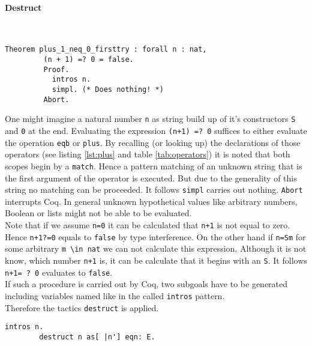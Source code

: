 	   \paragraph{Destruct}	~\vspace{-5mm}
	   \begin{lstlisting}[caption= \lstinline! plus_1_neq_0_firsttry!, label=lst:plus_1_neq_0_firsttry]
	   Theorem plus_1_neq_0_firsttry : forall n : nat,
	     (n + 1) =? 0 = false.
	     Proof.
	       intros n.
	       simpl. (* Does nothing! *)
	     Abort.
	   \end{lstlisting}
	    One might imagine a natural number \lstinline!n! as string build up of it's constructors \lstinline!S! and \lstinline!0! at the end.
	    Evaluating the expression \lstinline!(n+1) =? 0! suffices to either evaluate the operation \lstinline!eqb! or \lstinline!plus!.
	    By recalling (or looking up) the declarations of those operators (see listing \ref{lst:plus} and table \ref{tab:operators}) it is noted that both scopes begin by a \lstinline!match!.
	    Hence a pattern matching of an unknown string that is the first argument of the operator is executed.
	    But due to the generality of this string no matching can be proceeded. It follows \lstinline!simpl! carries out nothing. \lstinline!Abort! interrupts Coq.
	    In general unknown hypothetical values like arbitrary numbers, Boolean or lists might not be able to be evaluated.\\		
		Note that if we assume \lstinline!n=0! it can be calculated that \lstinline!n+1! is not equal to zero.
		Hence \lstinline!n+1?=0! equals to \lstinline!false! by type interference. 
		On the other hand if \lstinline!n=Sm! for some arbitrary \lstinline!m \in nat! we can not calculate this expression.
		Although it is not know, which number \lstinline!n+1! is, it can be calculate that it begins with an \lstinline!S!.
		It follows \lstinline!n+1= ? 0! evaluates to \lstinline!false!.\\	
	    If such a procedure is carried out by Coq, two subgoals have to be generated including variables named like in the called \lstinline!intros! pattern.\\        
	    Therefore the tactics \lstinline!destruct! is applied.	
		\begin{lstlisting}[caption = \lstinline! destruct!]
		intros n.
		destruct n as[ |n'] eqn: E.
		\end{lstlisting}
		
